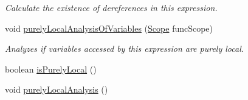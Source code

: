 \begin{DoxyCompactItemize}
\begin{DoxyCompactList}\small\item\em Calculate the existence of dereferences in this expression. \end{DoxyCompactList}\item 
void \hyperlink{classedu_1_1udel_1_1cis_1_1vsl_1_1civl_1_1model_1_1common_1_1expression_1_1CommonExpression_a1032ea11b6fe8d8fd2891fe3713417a6}{purely\+Local\+Analysis\+Of\+Variables} (\hyperlink{interfaceedu_1_1udel_1_1cis_1_1vsl_1_1civl_1_1model_1_1IF_1_1Scope}{Scope} func\+Scope)
\begin{DoxyCompactList}\small\item\em Analyzes if variables accessed by this expression are purely local. \end{DoxyCompactList}\item 
boolean \hyperlink{classedu_1_1udel_1_1cis_1_1vsl_1_1civl_1_1model_1_1common_1_1expression_1_1CommonExpression_ab51d59153d7a515cee619f440eaadc62}{is\+Purely\+Local} ()
\item 
\hypertarget{classedu_1_1udel_1_1cis_1_1vsl_1_1civl_1_1model_1_1common_1_1expression_1_1CommonExpression_af1274e0a80af5a579e8adb25cd6498b9}{}void \hyperlink{classedu_1_1udel_1_1cis_1_1vsl_1_1civl_1_1model_1_1common_1_1expression_1_1CommonExpression_af1274e0a80af5a579e8adb25cd6498b9}{purely\+Local\+Analysis} ()\label{classedu_1_1udel_1_1cis_1_1vsl_1_1civl_1_1model_1_1common_1_1expression_1_1CommonExpression_af1274e0a80af5a579e8adb25cd6498b9}


\end{DoxyCompactItemize}
